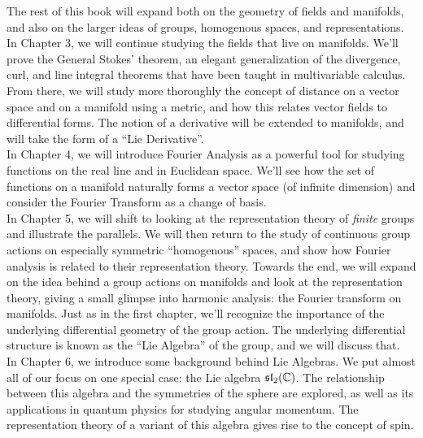 \documentclass[../master.tex]{subfiles}
\begin{document}
	
	The rest of this book will expand both on the geometry of fields and manifolds, and also on the larger ideas of groups, homogenous spaces, and representations. \\
	
	In Chapter 3, we will continue studying the fields that live on manifolds. We'll prove the General Stokes' theorem, an elegant generalization of the divergence, curl, and line integral theorems that have been taught in multivariable calculus. From there, we will study more thoroughly the concept of distance on a vector space and on a manifold using a metric, and how this relates vector fields to differential forms. The notion of a derivative will be extended to manifolds, and will take the form of a ``Lie Derivative''.\\
	
	In Chapter 4, we will introduce Fourier Analysis as a powerful tool for studying functions on the real line and in Euclidean space. We'll see how the set of functions on a manifold naturally forms a vector space (of infinite dimension) and consider the Fourier Transform as a change of basis. \\
	
	In Chapter 5, we will shift to looking at the representation theory of \emph{finite} groups and illustrate the parallels. We will then return to the study of continuous group actions on especially symmetric ``homogenous'' spaces, and show how Fourier analysis is related to their representation theory. Towards the end, we will expand on the idea behind a group actions on manifolds and look at the representation theory, giving a small glimpse into harmonic analysis: the Fourier transform on manifolds. Just as in the first chapter, we'll recognize the importance of the underlying differential geometry of the group action. The underlying differential structure is known as the ``Lie Algebra'' of the group, and we will discuss that.\\
	
	In Chapter 6, we introduce some background behind Lie Algebras. We put almost all of our focus on one special case: the Lie algebra $\frak{sl}_2 (\mathbb C)$. The relationship between this algebra and the symmetries of the sphere are explored, as well as its applications in quantum physics for studying angular momentum. The representation theory of a variant of this algebra gives rise to the concept of spin. \\
	
\end{document}
